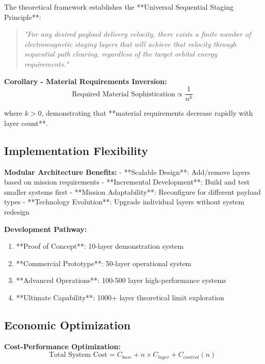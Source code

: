 \documentclass[12pt,a4paper]{article}
\begin{document}
The theoretical framework establishes the **Universal Sequential Staging Principle**:

\begin{quote}
\textit{"For any desired payload delivery velocity, there exists a finite number of electromagnetic staging layers that will achieve that velocity through sequential path clearing, regardless of the target orbital energy requirements."}
\end{quote}

\textbf{Corollary - Material Requirements Inversion:}
\begin{equation}
\text{Required Material Sophistication} \propto \frac{1}{n^k}
\end{equation}

where $k > 0$, demonstrating that **material requirements decrease rapidly with layer count**.

\subsection{Implementation Flexibility}

\textbf{Modular Architecture Benefits:}
- **Scalable Design**: Add/remove layers based on mission requirements
- **Incremental Development**: Build and test smaller systems first
- **Mission Adaptability**: Reconfigure for different payload types
- **Technology Evolution**: Upgrade individual layers without system redesign

\textbf{Development Pathway:}
\begin{enumerate}
\item **Proof of Concept**: 10-layer demonstration system
\item **Commercial Prototype**: 50-layer operational system
\item **Advanced Operations**: 100-500 layer high-performance systems
\item **Ultimate Capability**: 1000+ layer theoretical limit exploration
\end{enumerate}

\subsection{Economic Optimization}

\textbf{Cost-Performance Optimization:}
\begin{equation}
\text{Total System Cost} = C_{base} + n \times C_{layer} + C_{control}(n)
\end{equation}
\end{document}

